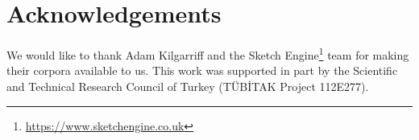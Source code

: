 \section*{Acknowledgements}
We would like to thank Adam Kilgarriff and the Sketch
Engine\footnote{\url{https://www.sketchengine.co.uk}} team for making
their corpora available to us.  This work was supported in part by the
Scientific and Technical Research Council of Turkey (T\"{U}B\.{I}TAK
Project 112E277).
